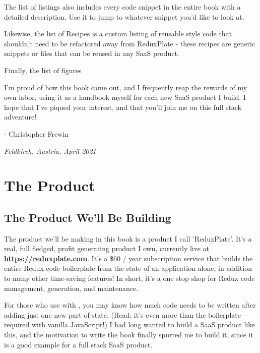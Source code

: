 \documentclass[paper=6in:9in,pagesize=pdftex,headinclude=on,footinclude=on,12pt,twoside]{scrbook}
\newcommand{\link}[2]{\textbf{\textcolor{monokaiPink}{\href{#2}{#1}}}}
\begin{document}
The list of listings also includes every code snippet in the entire book with a detailed description. Use it to jump to whatever snippet you'd like to look at.

Likewise, the list of Recipes is a custom listing of reusable style code that shouldn't need to be refactored away from ReduxPlate - these recipes are generic snippets or files that can be reused in any SaaS product.

Finally, the list of figures


I'm proud of how this book came out, and I frequently reap the rewards of my own labor, using it as a handbook myself for each new SaaS product I build. I hope that I've piqued your interest, and that you'll join me on this full stack adventure!

- Christopher Frewin

\textit{Feldkirch, Austria, April 2021}

\chapter{The Product}

\section{The Product We'll Be Building}

The product we'll be making in this book is a product I call 'ReduxPlate'. It's a real, full fledged, profit generating product I own, currently live at \link{https://reduxplate.com}{https://reduxplate.com}. It's a \$60 / year subscription service that builds the entire Redux code boilerplate from the state of an application alone, in addition to many other time-saving features! In short, it's a one stop shop for Redux code management, generation, and maintenance.

For those who use  with , you may know how much code needs to be written after adding just one new part of state. (Read: it's even more than the boilerplate required with vanilla JavaScript!) I had long wanted to build a SaaS product like this, and the motivation to write the book finally spurred me to build it, since it is a good example for a full stack SaaS product. 
\end{document}
